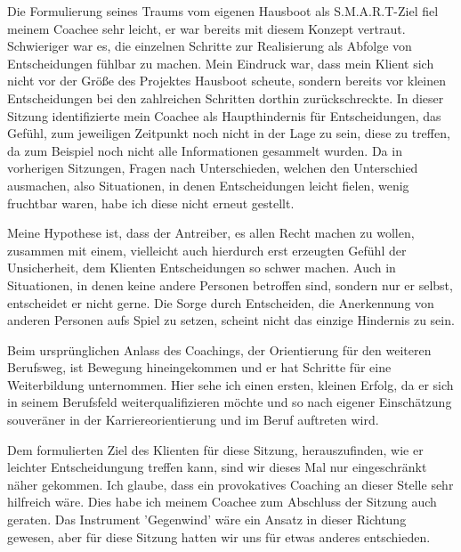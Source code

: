 \documentclass[11pt,a4paper]{article}
\begin{document}
Die Formulierung seines Traums vom eigenen Hausboot als S.M.A.R.T-Ziel fiel meinem Coachee sehr leicht, er war bereits mit diesem Konzept vertraut. Schwieriger war es, die einzelnen Schritte zur Realisierung als Abfolge von Entscheidungen fühlbar zu machen. Mein Eindruck war, dass mein Klient sich nicht vor der Größe des Projektes Hausboot scheute, sondern bereits vor kleinen Entscheidungen bei den zahlreichen Schritten dorthin zurückschreckte. In dieser Sitzung identifizierte mein Coachee als Haupthindernis für Entscheidungen, das Gefühl, zum jeweiligen Zeitpunkt noch nicht in der Lage zu sein, diese zu treffen, da zum Beispiel noch nicht alle Informationen gesammelt wurden. Da in vorherigen Sitzungen, Fragen nach Unterschieden, welchen den Unterschied ausmachen, also Situationen, in denen Entscheidungen leicht fielen, wenig fruchtbar waren, habe ich diese nicht erneut gestellt. 

Meine Hypothese ist, dass der Antreiber, es allen Recht machen zu wollen, zusammen mit einem, vielleicht auch hierdurch erst erzeugten Gefühl der Unsicherheit, dem Klienten Entscheidungen so schwer machen. Auch in Situationen, in denen keine andere Personen betroffen sind, sondern nur er selbst, entscheidet er nicht gerne. Die Sorge durch Entscheiden, die Anerkennung von anderen Personen aufs Spiel zu setzen, scheint nicht das einzige Hindernis zu sein.

Beim ursprünglichen Anlass des Coachings, der Orientierung für den weiteren Berufsweg, ist Bewegung hineingekommen und er hat Schritte für eine Weiterbildung unternommen. Hier sehe ich einen ersten, kleinen Erfolg, da er sich in seinem Berufsfeld weiterqualifizieren möchte und so nach eigener Einschätzung souveräner in der Karriereorientierung und im Beruf auftreten wird.

Dem formulierten Ziel des Klienten für diese Sitzung, herauszufinden, wie er leichter Entscheidungung treffen kann, sind wir dieses Mal nur eingeschränkt näher gekommen. Ich glaube, dass ein provokatives Coaching an dieser Stelle sehr hilfreich wäre. Dies habe ich meinem Coachee zum Abschluss der Sitzung auch geraten. Das Instrument 'Gegenwind' wäre ein Ansatz in dieser Richtung gewesen, aber für diese Sitzung hatten wir uns für etwas anderes entschieden.


\subsection*{\color{Orange}{Schlussbetrachtung des Coaching-Prozesses}}
\end{document}
